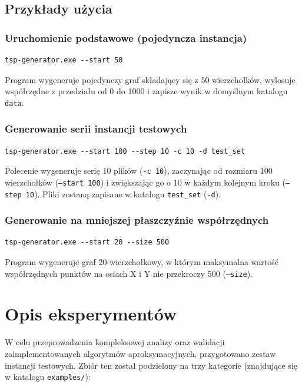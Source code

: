 \documentclass{article}
\theoremstyle{definition}
\theoremstyle{plain}
\theoremstyle{remark}
\begin{document}
\subsection{Przykłady użycia}

\subsubsection*{Uruchomienie podstawowe (pojedyncza instancja)}

\begin{verbatim}
tsp-generator.exe --start 50
\end{verbatim}

\noindent
Program wygeneruje pojedynczy graf składający się z 50 wierzchołków, wylosuje współrzędne z przedziału od 0 do 1000 i zapisze wynik w domyślnym katalogu \texttt{data}.

\subsubsection*{Generowanie serii instancji testowych}

\begin{verbatim}
tsp-generator.exe --start 100 --step 10 -c 10 -d test_set
\end{verbatim}

\noindent
Polecenie wygeneruje serię 10 plików (\texttt{-c 10}), zaczynając od rozmiaru 100 wierzchołków (\texttt{--start 100}) i zwiększając go o 10 w każdym kolejnym kroku (\texttt{--step 10}). Pliki zostaną zapisane w katalogu \texttt{test\_set} (\texttt{-d}).

\subsubsection*{Generowanie na mniejszej płaszczyźnie współrzędnych}

\begin{verbatim}
tsp-generator.exe --start 20 --size 500
\end{verbatim}

\noindent
Program wygeneruje graf 20-wierzchołkowy, w którym maksymalna wartość współrzędnych punktów na osiach X i Y nie przekroczy 500 (\texttt{--size}).

\newpage
\section{Opis eksperymentów}
\label{sec:opis_testow}

W celu przeprowadzenia kompleksowej analizy oraz walidacji zaimplementowanych algorytmów aproksymacyjnych, przygotowano zestaw instancji testowych. Zbiór ten został podzielony na trzy kategorie (znajdujące się w katalogu \texttt{examples/}):
\end{document}
